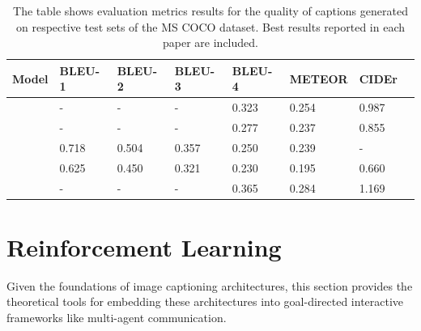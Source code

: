\begin{table}[]
	\begin{tabularx}{\textwidth}{|X|l|l|l|l|l|l|l|}
		\hline
		Model                               & BLEU-1 & BLEU-2 & BLEU-3 & BLEU-4 & METEOR & CIDEr \\ \hline
		\cite{bengio2015scheduled}        & -      & -      & -      & 0.323   & 0.254  & 0.987 \\ \hline
		\cite{vinyals2015show}  & -      & -      & -      & 0.277    & 0.237  & 0.855 \\ \hline
		\cite{xu2015show} & 0.718  & 0.504  & 0.357  & 0.250     & 0.239  & -     \\ \hline
		\cite{karpathy2015deep}          & 0.625  & 0.450  & 0.321  & 0.230   & 0.195  & 0.660 \\ \hline
		\cite{zhou2019unified}          & -  & -  & -  & 0.365   & 0.284  & 1.169 \pt{?} \\ \hline
	\end{tabularx}
\caption{\label{tab_coco_metrics_ref}The table shows evaluation metrics results for the quality of captions generated on respective test sets of the MS COCO dataset. Best results reported in each paper are included.}
\end{table}

\section{Reinforcement Learning}
\label{rl}

Given the foundations of image captioning architectures, this section provides the theoretical tools for embedding these architectures into goal-directed interactive frameworks like multi-agent communication.

